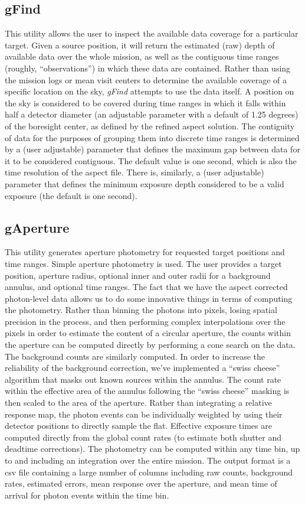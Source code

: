 \documentclass[preprint]{aastex}
\begin{document}
\subsection{gFind}
This utility allows the user to inspect the available data coverage for a particular target. Given a source position, it will return the estimated (raw) depth of available data over the whole mission, as well as the contiguous time ranges (roughly, ``observations'') in which these data are contained. Rather than using the mission logs or mean visit centers to determine the available coverage of a specific location on the sky, \textit{gFind} attempts to use the data itself. A position on the sky is considered to be covered during time ranges in which it falls within half a detector diameter (an adjustable parameter with a default of 1.25 degrees) of the boresight center, as defined by the refined aspect solution. The contiguity of data for the purposes of grouping them into discrete time ranges is determined by a (user adjustable) parameter that defines the maximum gap between data for it to be considered contiguous.  The default value is one second, which is also the time resolution of the aspect file. There is, similarly, a (user adjustable) parameter that defines the minimum exposure depth considered to be a valid exposure (the default is one second).

\subsection{gAperture}
This utility generates aperture photometry for requested target positions and time ranges. Simple aperture photometry is used. The user provides a target position, aperture radius, optional inner and outer radii for a background annulus, and optional time ranges. The fact that we have the aspect corrected photon-level data allows us to do some innovative things in terms of computing the photometry. Rather than binning the photons into pixels, losing spatial precision in the process, and then performing complex interpolations over the pixels in order to estimate the content of a circular aperture, the counts within the aperture can be computed directly by performing a cone search on the data. The background counts are similarly computed. In order to increase the reliability of the background correction, we’ve implemented a ``swiss cheese'' algorithm that masks out known sources within the annulus.  The count rate within the effective area of the annulus following the ``swiss cheese'' masking is then scaled to the area of the aperture. Rather than integrating a relative response map, the photon events can be individually weighted by using their detector positions to directly sample the flat. Effective exposure times are computed directly from the global count rates (to estimate both shutter and deadtime corrections). The photometry can be computed within any time bin, up to and including an integration over the entire mission. The output format is a csv file containing a large number of columns including raw counts, background rates, estimated errors, mean response over the aperture, and mean time of arrival for photon events within the time bin.
\end{document}
